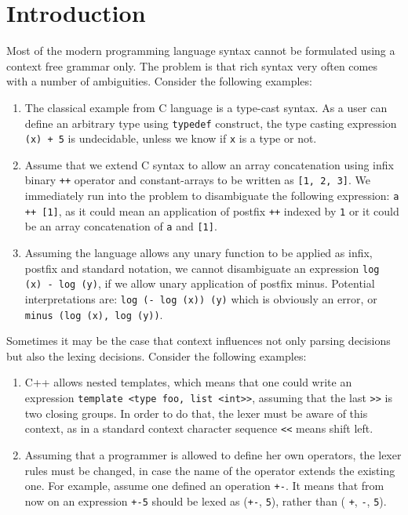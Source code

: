 \section{Introduction}

Most of the modern programming language syntax cannot be formulated
using a context free grammar only.  The problem is that rich
syntax very often comes with a number of ambiguities.  Consider the 
following examples:
\begin{enumerate}
    \item The classical example from C language is a type-cast 
          syntax.  As a user can define an arbitrary type using
          \verb|typedef| construct, the type casting expression
          \verb|(x) + 5| is undecidable, unless we know if
          \verb|x| is a type or not.
    \item Assume that we extend C syntax to allow an array 
          concatenation using infix binary \verb|++| operator and
          constant-arrays to be written as \verb|[1, 2, 3]|.
          We immediately run into the problem to disambiguate the 
          following expression: \verb|a ++ [1]|, as it could mean
          an application of postfix \verb|++| indexed by \verb|1|
          or it could be an array concatenation of \verb|a| and 
          \verb|[1]|.
    \item Assuming the language allows any unary function to be
          applied as infix, postfix and standard notation, we cannot 
          disambiguate an expression \verb|log (x) - log (y)|, if
          we allow unary application of postfix minus.  Potential
          interpretations are: \verb|log (- log (x)) (y)| which is
          obviously an error, or \verb|minus (log (x), log (y))|.
\end{enumerate}

Sometimes it may be the case that context influences not only
parsing decisions but also the lexing decisions.  Consider
the following examples:
\begin{enumerate}
    \item C++ allows nested templates, which means that one could
          write an expression \verb|template <type foo, list <int>>|, 
          assuming that the last \verb|>>| is two closing groups.  In
          order to do that, the lexer must be aware of this context,
          as in a standard context character sequence \verb|<<| means
          shift left.
    \item Assuming that a programmer is allowed to define her own 
          operators, the lexer rules must be changed, in case 
          the name of the operator extends the existing one.  For
          example, assume one defined an operation \verb|+-|.
          It means that from now on an expression \verb|+-5| should
          be lexed as (\verb|+-|, \verb|5|), rather than (
          \verb|+|, \verb|-|, \verb|5|).
\end{enumerate}

